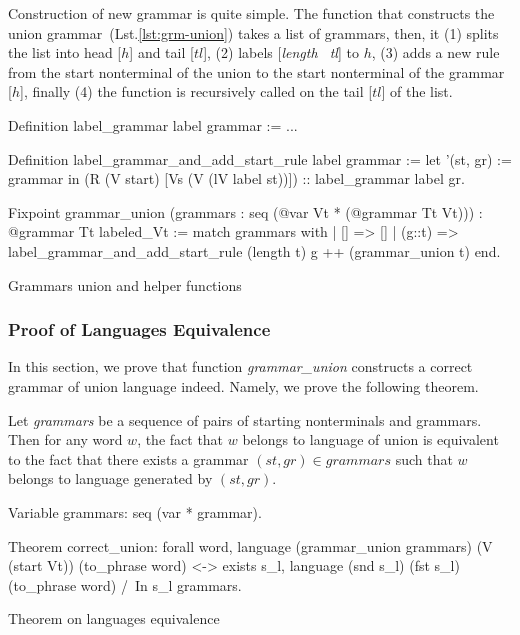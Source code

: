 Construction of new grammar is quite simple. The function that constructs the union grammar~(Lst.\ref{lst:grm-union}) takes a list of grammars, then, it (1) splits the list into head [$h$] and tail [$tl$], (2) labels [\textit{length \ tl}] to $h$, (3) adds a new rule from the start nonterminal of the union to the start nonterminal of the grammar [$h$], finally (4) the function is recursively called on the tail [$tl$] of the list.

\begin{listing}[h]
    \begin{pyglist}[language=coq, numbers=none, numbersep=5pt]
  Definition label_grammar label grammar := ...

  Definition label_grammar_and_add_start_rule 
               label 
               grammar :=
    let '(st, gr) := grammar in 
    (R (V start) [Vs (V (lV label st))]) 
       :: label_grammar label gr.        

  Fixpoint grammar_union 
     (grammars : seq (@var Vt * (@grammar Tt Vt)))
       : @grammar 
     Tt 
     labeled_Vt :=
    match grammars with
    |  [] => []
    |  (g::t) => 
         label_grammar_and_add_start_rule 
           (length t) 
           g ++ (grammar_union t)
    end.
    \end{pyglist}
    \caption{Grammars union and helper functions}
    \label{lst:grm-union}
\end{listing}

\subsubsection{Proof of Languages Equivalence}

In this section, we prove that function \textit{grammar\_union} constructs a correct grammar of union language indeed. Namely, we prove the following theorem.

\begin{theorem} \label{theorem-correct-union}
    Let \textit{grammars} be a sequence of pairs of starting nonterminals and grammars. Then for any word $w$, the fact that $w$ belongs to language of union is equivalent to the fact that there exists a grammar $(st,gr) \in \textit{grammars}$ such that $w$ belongs to language generated by $(st,gr)$.
\end{theorem}

\begin{listing}[h]
    \begin{pyglist}[language=coq, numbers=none, numbersep=5pt]
  Variable grammars: seq (var * grammar).

  Theorem correct_union:
    forall word, 
      language (grammar_union grammars) 
        (V (start Vt)) (to_phrase word) <->
      exists s_l, 
        language (snd s_l) (fst s_l) 
          (to_phrase word) /\ 
        In s_l grammars.
    \end{pyglist}
    \caption{Theorem on languages equivalence}
    \label{lst:lang-eq}
\end{listing}


